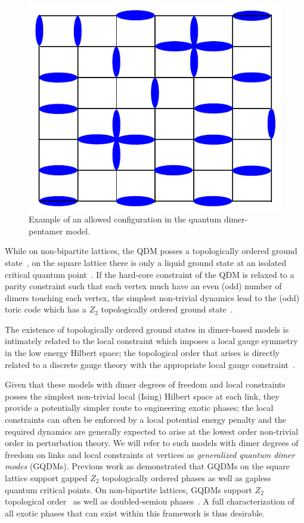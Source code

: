 \documentclass[twocolumn,prb,aps,floatfix,superscriptaddress]{revtex4-1}
\begin{document}
\begin{figure}[b!]
    \centering
    \includegraphics[width=0.5\columnwidth]{QDPM_ex_config.pdf}
    \caption{Example of an allowed configuration in the quantum dimer-pentamer model.}
    \label{fig:QDPMex}
\end{figure}

While on non-bipartite lattices, the QDM posses a topologically ordered ground state~\cite{Moessner2001a,Fendley2002}, on the square lattice there is only a liquid ground state at an isolated critical quantum point~\cite{Leung1996,Syljuasen2006}. If the hard-core constraint of the QDM is relaxed to a parity constraint such that each vertex much have an even (odd) number of dimers touching each vertex, the simplest non-trivial dynamics lead to the (odd) toric code which has a $Z_2$ topologically ordered ground state~\cite{Kitaev2003,Wen2003}. 

The existence of topologically ordered ground states in dimer-based models is intimately related to the local constraint which imposes a local gauge symmetry in the low energy Hilbert space; the topological order that arises is directly related to a discrete gauge theory with the appropriate local gauge constraint~\cite{Moessner2001}.

Given that these models with dimer degrees of freedom and local constraints posses the simplest non-trivial local (Ising) Hilbert space at each link, they provide a potentially simpler route to engineering exotic phases; the local constraints can often be enforced by a local potential energy penalty and the required dynamics are generally expected to arise at the lowest order non-trivial order in perturbation theory. We will refer to such models with dimer degrees of freedom on links and local constraints at vertices as \emph{generalized quantum dimer modes} (GQDMs). Previous work as demonstrated that GQDMs on the square lattice support gapped $Z_2$ topologically ordered phases as well as gapless quantum critical points. On non-bipartite lattices, GQDMs support $Z_2$ topological order~\cite{Moessner2001a,Misguich2002} as well as doubled-semion phases~\cite{Qi2014,Buerschaper2014a}. A full characterization of all exotic phases that can exist within this framework is thus desirable.
\end{document}
